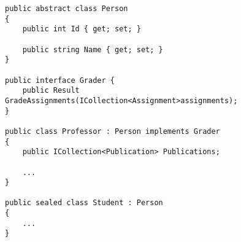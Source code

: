 \begin{lstlisting}
public abstract class Person
{
    public int Id { get; set; }

    public string Name { get; set; }
}

public interface Grader {
    public Result GradeAssignments(ICollection<Assignment>assignments);
}

public class Professor : Person implements Grader
{
    public ICollection<Publication> Publications;

    ...
}

public sealed class Student : Person
{
    ...
}
\end{lstlisting}